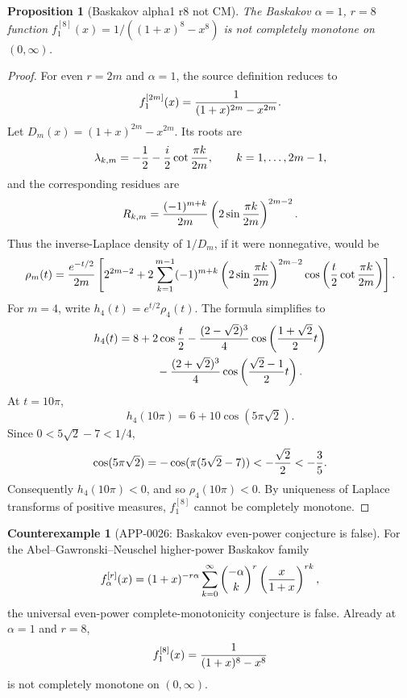 \documentclass[11pt]{article}
\numberwithin{equation}{section}
\newtheorem{proposition}[theorem]{Proposition}
\theoremstyle{definition}
\newtheorem{counterexample}[theorem]{Counterexample}
\theoremstyle{remark}
\newcommand{\1}{\mathbf 1}
\begin{document}
\begin{proposition}[Baskakov alpha1 r8 not CM]
\label{res:baskakov-alpha1-r8-not-cm}
The Baskakov \(\alpha=1\), \(r=8\) function \(f^{[8]}_1(x)=1/((1+x)^8-x^8)\) is not completely monotone on \((0,\infty)\).
\end{proposition}

\begin{proof}
For even \(r=2m\) and \(\alpha=1\), the source definition reduces to
\[
 f^{[2m]}_1(x)={1\over(1+x)^{2m}-x^{2m}}.
\]
Let \(D_m(x)=(1+x)^{2m}-x^{2m}\).  Its roots are
\[
 \lambda_{k,m}=-{1\over2}-{i\over2}\cot{\pi k\over 2m},
 \qquad k=1,\ldots,2m-1,
\]
and the corresponding residues are
\[
 R_{k,m}={(-1)^{m+k}\over2m}
 \left(2\sin{\pi k\over2m}\right)^{2m-2}.
\]
Thus the inverse-Laplace density of \(1/D_m\), if it were nonnegative, would
be
\[
 \rho_m(t)={e^{-t/2}\over2m}
 \left[
 2^{2m-2}
 +2\sum_{k=1}^{m-1}(-1)^{m+k}
 \left(2\sin{\pi k\over2m}\right)^{2m-2}
 \cos\left({t\over2}\cot{\pi k\over2m}\right)
 \right].
\]
For \(m=4\), write \(h_4(t)=e^{t/2}\rho_4(t)\).  The formula simplifies to
\[
\begin{aligned}
 h_4(t)
 &=8+2\cos{t\over2}
 -{(2-\sqrt2)^3\over4}\cos\left({1+\sqrt2\over2}t\right) \\
 &\hspace{1.2cm}
 -{(2+\sqrt2)^3\over4}\cos\left({\sqrt2-1\over2}t\right).
\end{aligned}
\]
At \(t=10\pi\),
\[
 h_4(10\pi)=6+10\cos(5\pi\sqrt2).
\]
Since \(0<5\sqrt2-7<1/4\),
\[
 \cos(5\pi\sqrt2)=-\cos(\pi(5\sqrt2-7))
 <-{\sqrt2\over2}<-{3\over5}.
\]
Consequently \(h_4(10\pi)<0\), and so \(\rho_4(10\pi)<0\).  By uniqueness of
Laplace transforms of positive measures, \(f^{[8]}_1\) cannot be completely
monotone.
\end{proof}

\begin{counterexample}[APP-0026: Baskakov even-power conjecture is false]
\label{thm:app26-baskakov-r8}
For the Abel--Gawronski--Neuschel higher-power Baskakov family
\[
 f^{[r]}_\alpha(x)
 =(1+x)^{-r\alpha}\sum_{k=0}^\infty
 \binom{-\alpha}{k}^{r}\left({x\over1+x}\right)^{rk},
\]
the universal even-power complete-monotonicity conjecture is false.  Already
at \(\alpha=1\) and \(r=8\),
\[
 f^{[8]}_1(x)={1\over (1+x)^8-x^8}
\]
is not completely monotone on \((0,\infty)\).


\end{counterexample}
\end{document}
